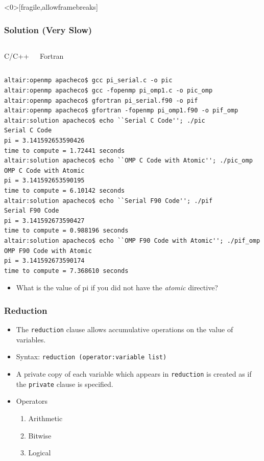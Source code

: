 \documentclass[10pt,t]{beamer}
\begin{document}
\begin{frame}<0>[fragile,allowframebreaks]
  \frametitle{Solution (Very Slow)}
  \begin{columns}
    \vspace{-0.5cm}
    \begin{exampleblock}{C/C++}
      
    \end{exampleblock}
    \vspace{-0.5cm}
    \begin{exampleblock}{Fortran}
      
    \end{exampleblock}
  \end{columns}
  \begin{block}{}
    {\tiny
      \begin{verbatim}
altair:openmp apacheco$ gcc pi_serial.c -o pic
altair:openmp apacheco$ gcc -fopenmp pi_omp1.c -o pic_omp
altair:openmp apacheco$ gfortran pi_serial.f90 -o pif
altair:openmp apacheco$ gfortran -fopenmp pi_omp1.f90 -o pif_omp
altair:solution apacheco$ echo ``Serial C Code''; ./pic
Serial C Code
pi = 3.141592653590426
time to compute = 1.72441 seconds
altair:solution apacheco$ echo ``OMP C Code with Atomic''; ./pic_omp
OMP C Code with Atomic
pi = 3.141592653590195
time to compute = 6.10142 seconds
altair:solution apacheco$ echo ``Serial F90 Code''; ./pif
Serial F90 Code
pi = 3.141592673590427
time to compute = 0.988196 seconds
altair:solution apacheco$ echo ``OMP F90 Code with Atomic''; ./pif_omp
OMP F90 Code with Atomic
pi = 3.141592673590174
time to compute = 7.368610 seconds
      \end{verbatim}
    }
  \end{block}
  \begin{itemize}
    \item What is the value of pi if you did not have the \textit{atomic} directive?
  \end{itemize}
\end{frame}

\begin{frame}
  \frametitle{Reduction}
  \begin{itemize}
    \item The \texttt{reduction} clause allows accumulative operations on the value of variables.
    \item Syntax: \texttt{reduction (operator:variable list)}
    \item A private copy of each variable which appears in \texttt{reduction} is created as if the \texttt{private} clause is specified.
    \item Operators
    \begin{enumerate}
      \item Arithmetic
      \item Bitwise
      \item Logical
    \end{enumerate}
  \end{itemize}
\end{frame}
\end{document}
